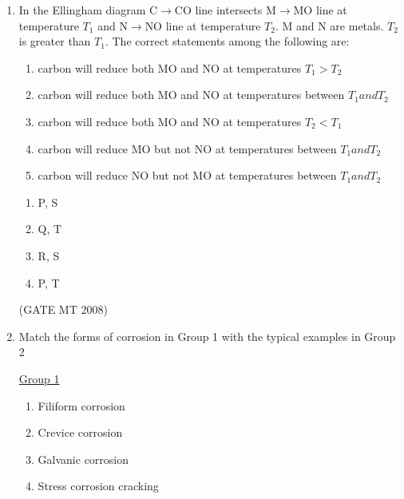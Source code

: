 \documentclass[11pt, letterpaper]{article}
\theoremstyle{remark}
\begin{document}
\begin{enumerate}[label=Q.\arabic*]
\item In the Ellingham diagram C$\rightarrow$CO line intersects M$\rightarrow$MO line at temperature $T_1$ and N$\rightarrow$NO line at temperature $T_2$. M and N are metals. $T_2$ is greater than $T_1$. The correct statements among the following are:
        \begin{enumerate}[label=(\MakeUppercase{\alph*}), start= 16]
            \item carbon will reduce both MO and NO at temperatures $T_1 > T_2$
            \item carbon will reduce both MO and NO at temperatures between $T_1 and T_2$
            \item carbon will reduce both MO and NO at temperatures $T_2 < T_1$
            \item carbon will reduce MO but not NO at temperatures between $T_1 and T_2$
            \item carbon will reduce NO but not MO at temperatures between $T_1 and T_2$
        \end{enumerate}
    
    \begin{multicols}{2}
        \begin{enumerate}[label=(\MakeUppercase{\alph*})]
            \item P, S
            \item Q, T
            \item R, S
            \item P, T
        \end{enumerate}
    \end{multicols}
\hfill(GATE MT 2008)

\item Match the forms of corrosion in Group 1 with the typical examples in Group 2
\begin{multicols}{2}
    \underline{Group 1}
    \begin{enumerate}[label=(\Alph*), start=16]
        \item Filiform corrosion  
        \item Crevice corrosion
        \item Galvanic corrosion
        \item Stress corrosion cracking 
    \end{enumerate}


\end{multicols}
\end{enumerate}
\end{document}

